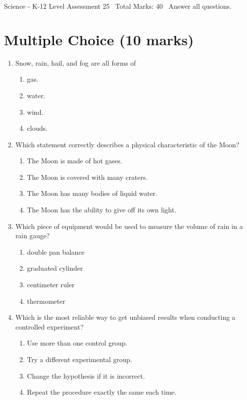 \documentclass[12pt]{article}
\begin{document}
\begin{center}
Science - K-12 Level Assessment 25 \
Total Marks: 40 \
Answer all questions.
\end{center}

\section*{Multiple Choice (10 marks)}
\begin{enumerate}[label=\arabic*.]
\item Snow, rain, hail, and fog are all forms of
\begin{enumerate}[label=(\alph*)]
    \item gas.
    \item water.
    \item wind.
    \item clouds.
\end{enumerate}
\item Which statement correctly describes a physical characteristic of the Moon?
\begin{enumerate}[label=(\alph*)]
    \item The Moon is made of hot gases.
    \item The Moon is covered with many craters.
    \item The Moon has many bodies of liquid water.
    \item The Moon has the ability to give off its own light.
\end{enumerate}
\item Which piece of equipment would be used to measure the volume of rain in a rain gauge?
\begin{enumerate}[label=(\alph*)]
    \item double pan balance
    \item graduated cylinder
    \item centimeter ruler
    \item thermometer
\end{enumerate}
\item Which is the most reliable way to get unbiased results when conducting a controlled experiment?
\begin{enumerate}[label=(\alph*)]
    \item Use more than one control group.
    \item Try a different experimental group.
    \item Change the hypothesis if it is incorrect.
    \item Repeat the procedure exactly the same each time.

\end{enumerate}
\end{enumerate}
\end{document}
